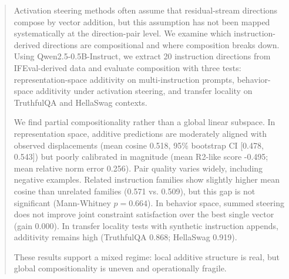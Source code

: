 \begin{abstract}
Activation steering methods often assume that residual-stream directions compose by vector addition, but this assumption has not been mapped systematically at the direction-pair level. We examine which instruction-derived directions are compositional and where composition breaks down. Using Qwen2.5-0.5B-Instruct, we extract 20 instruction directions from IFEval-derived data and evaluate composition with three tests: representation-space additivity on multi-instruction prompts, behavior-space additivity under activation steering, and transfer locality on TruthfulQA and HellaSwag contexts.

We find partial compositionality rather than a global linear subspace. In representation space, additive predictions are moderately aligned with observed displacements (mean cosine 0.518, 95\% bootstrap CI [0.478, 0.543]) but poorly calibrated in magnitude (mean R2-like score -0.495; mean relative norm error 0.256). Pair quality varies widely, including negative examples. Related instruction families show slightly higher mean cosine than unrelated families (0.571 vs. 0.509), but this gap is not significant (Mann-Whitney $p=0.664$). In behavior space, summed steering does not improve joint constraint satisfaction over the best single vector (gain 0.000). In transfer locality tests with synthetic instruction appends, additivity remains high (TruthfulQA 0.868; HellaSwag 0.919).

These results support a mixed regime: local additive structure is real, but global compositionality is uneven and operationally fragile.
\end{abstract}
